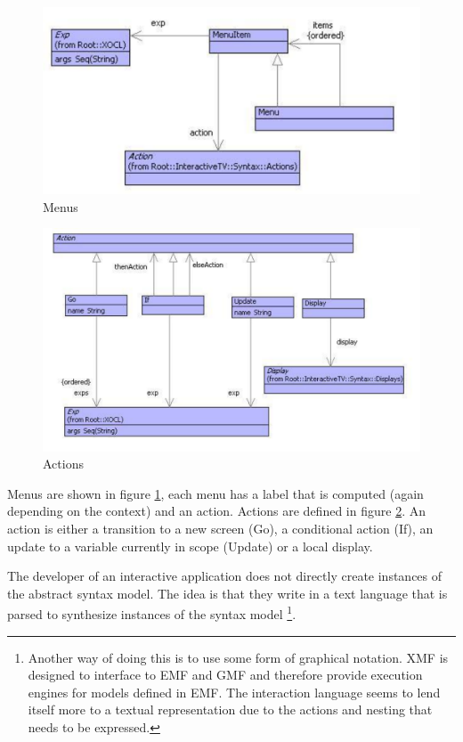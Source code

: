 %
\begin{figure}
\begin{center}
\includegraphics[width=12cm]{LanguageEngineering/Interactive/Images/Menus}

\caption{Menus\label{fig:Menus}}
\end{center}
\end{figure}


%
\begin{figure}
\begin{center}

\includegraphics[width=12cm]{LanguageEngineering/Interactive/Images/Actions}

\caption{Actions\label{fig:Actions}}

\end{center}
\end{figure}


Menus are shown in figure \ref{fig:Menus}, each menu has a label
that is computed (again depending on the context) and an action. Actions
are defined in figure \ref{fig:Actions}. An action is either a transition
to a new screen (Go), a conditional action (If), an update to a variable
currently in scope (Update) or a local display.

The developer of an interactive application does not directly create
instances of the abstract syntax model. The idea is that they write
in a text language that is parsed to synthesize instances of the syntax
model%
\footnote{Another way of doing this is to use some form of graphical notation.
XMF is designed to interface to EMF and GMF and therefore provide
execution engines for models defined in EMF. The interaction language
seems to lend itself more to a textual representation due to the actions
and nesting that needs to be expressed.%
}.

